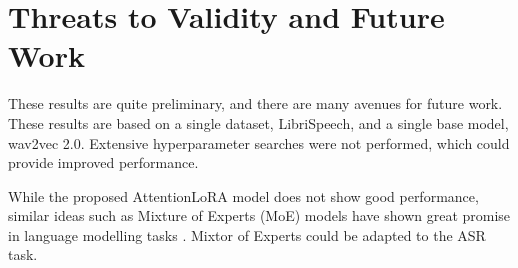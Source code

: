 \section{Threats to Validity and Future Work}

These results are quite preliminary, and there are many avenues for future work.
These results are based on a single dataset, LibriSpeech, and a single base model, wav2vec 2.0.
Extensive hyperparameter searches were not performed, which could provide improved performance.


While the proposed AttentionLoRA model does not show good performance, similar ideas such as Mixture of Experts (MoE) models have shown great promise in language modelling tasks \cite{shazeer2017outrageously}.
Mixtor of Experts could be adapted to the ASR task.

